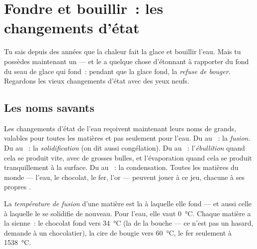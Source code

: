 \chapter{Fondre et bouillir~: les changements d'état}\label{ch:g4:changes-of-state}

Tu sais depuis des années que la chaleur fait  la glace et
bouillir l'eau. Mais tu possèdes maintenant un  --- et le
 a quelque chose d'étonnant à rapporter du fond du seau de
glace qui fond~: pendant que la glace fond, la 
\emph{refuse de bouger}. Regardons les vieux changements d'état avec
des yeux neufs.

\section{Les noms savants}

Les changements d'état de l'eau reçoivent maintenant leurs noms de
grands, valables pour toutes les matières et pas seulement pour
l'eau. Du  au ~: la \emph{fusion}. Du
 au ~: la \emph{solidification}
(on dit aussi congélation). Du  au ~:
l'\emph{ébullition} quand cela se produit vite,
avec de grosses bulles, et l'évaporation quand cela se produit
tranquillement à la surface. Du  au ~: la condensation.
Toutes les matières du monde --- l'eau, le chocolat, le fer, l'or ---
peuvent jouer à ce jeu, chacune à ses propres .

\begin{definition}\label{def:g4:changes-of-state:melting-point}
La \emph{température de fusion} d'une
matière est la  à laquelle elle fond --- et aussi celle à
laquelle le  se solidifie de nouveau. Pour l'eau, elle vaut
\qty{0}{\celsius}. Chaque matière a la sienne~: le chocolat fond vers
\qty{34}{\celsius} (la  de la bouche --- ce n'est pas un
hasard, demande à un chocolatier), la cire de bougie vers
\qty{60}{\celsius}, le fer seulement à \qty{1538}{\celsius}.
\end{definition}

